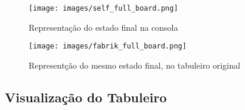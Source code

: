 \documentclass[a4paper]{article}
\begin{document}
\begin{figure}[h!]
\centering
\begin{minipage}{.35\textwidth}
	\centering
	\texttt{[image: images/self\_full\_board.png]}
	\caption{Representação do estado final na consola}
	\label{Figura 7}
\end{minipage}
\quad \quad
\begin{minipage}{.35\textwidth}
	\centering
	\texttt{[image: images/fabrik\_full\_board.png]}
	\caption{Representção do mesmo estado final, no tabuleiro original}
	\label{Figura 8}
\end{minipage}
\end{figure}

\clearpage


\subsection{Visualização do Tabuleiro}
\end{document}
